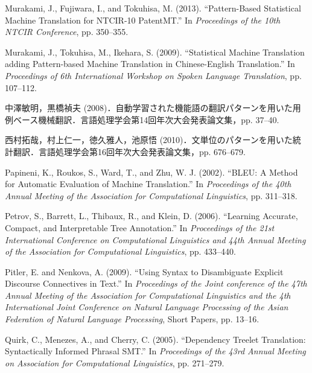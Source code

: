 \documentclass[japanese]{jnlp_1.4}
\begin{document}
\begin{thebibliography}{}
\item
Murakami, J., Fujiwara, I., and Tokuhisa, M. (2013). ``Pattern-Based 
Statistical Machine Translation for NTCIR-10 PatentMT.'' In \textit{Proceedings of the 10th NTCIR Conference}, pp. 350--355.

\item
Murakami, J., Tokuhisa, M., Ikehara, S. (2009). ``Statistical Machine 
Translation adding Pattern-based Machine Translation in Chinese-English 
Translation.'' In \textit{Proceedings of 6th International Workshop on Spoken Language Translation}, pp. 107--112.

\item
中澤敏明，黒橋禎夫 (2008)．自動学習された機能語の翻訳パターンを用いた用例ベース機械翻訳．言語処理学会第14回年次大会発表論文集，pp. 
37--40.

\item
西村拓哉，村上仁一，徳久雅人，池原悟 (2010)．文単位のパターンを用いた統計翻訳．言語処理学会第16回年次大会発表論文集，pp. 
676--679.

\item
Papineni, K., Roukos, S., Ward, T., and Zhu, W. J. (2002). ``BLEU: A Method 
for Automatic Evaluation of Machine Translation.'' In \textit{Proceedings of the 40th Annual Meeting of the \mbox{Association} for Computational Linguistics}, pp. 311--318.

\item
Petrov, S., Barrett, L., Thibaux, R., and Klein, D. (2006). ``Learning 
Accurate, Compact, and Interpretable Tree Annotation.'' In \textit{Proceedings of the 21st International Conference on \mbox{Computational} Linguistics and 44th Annual Meeting of the Association for Computational \mbox{Linguistics}}, pp. 433--440.

\item
Pitler, E. and Nenkova, A. (2009). ``Using Syntax to Disambiguate Explicit 
Discourse Connectives in Text.'' In \textit{Proceedings of the Joint conference of the 47th Annual Meeting of the Association for Computational Linguistics and the 4th International Joint Conference on Natural Language Processing of the Asian Federation of Natural Language Processing}, Short Papers, pp. 13--16.

\item
Quirk, C., Menezes, A., and Cherry, C. (2005). ``Dependency Treelet 
Translation: Syntactically Informed Phrasal SMT.'' In \textit{Proceedings of the 43rd Annual Meeting on Association for Computational Linguistics}, pp. 271--279.


\end{thebibliography}
\end{document}
